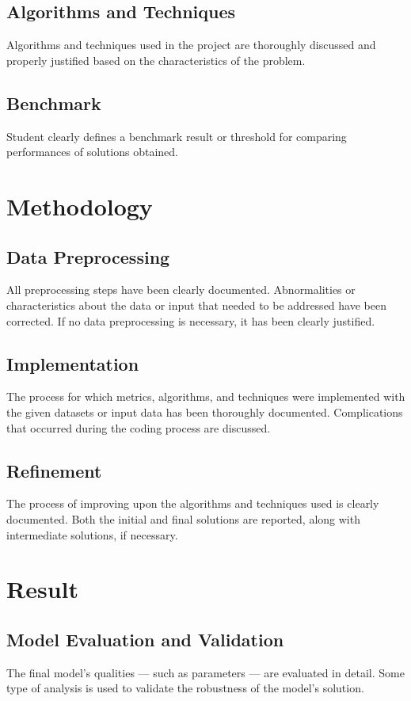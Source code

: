 \documentclass[a4paper,10pt,fleqn]{article}
\begin{document}
\subsection{Algorithms and Techniques}
Algorithms and techniques used in the project are thoroughly discussed and properly justified based on the characteristics of the problem.


\subsection{Benchmark}
Student clearly defines a benchmark result or threshold for comparing performances of solutions obtained.


\section{Methodology}
\subsection{Data Preprocessing}
All preprocessing steps have been clearly documented. Abnormalities or characteristics about the data or input that needed to be addressed have been corrected. If no data preprocessing is necessary, it has been clearly justified.


\subsection{Implementation}
The process for which metrics, algorithms, and techniques were implemented with the given datasets or input data has been thoroughly documented. Complications that occurred during the coding process are discussed.

\subsection{Refinement}
The process of improving upon the algorithms and techniques used is clearly documented. Both the initial and final solutions are reported, along with intermediate solutions, if necessary.



\section{Result}
\subsection{Model Evaluation and Validation}
The final model’s qualities — such as parameters — are evaluated in detail. Some type of analysis is used to validate the robustness of the model’s solution.
\end{document}
